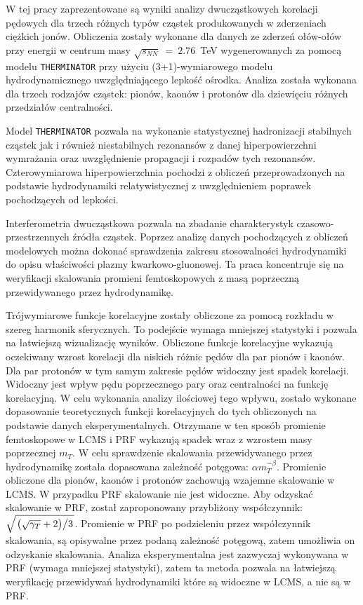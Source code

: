 W tej pracy zaprezentowane są wyniki analizy dwucząstkowych korelacji pędowych dla trzech różnych typów cząstek produkowanych w zderzeniach ciężkich jonów.
Obliczenia zostały wykonane dla danych ze zderzeń ołów-ołów przy energii w centrum masy $\sqrt{s_{NN}}~=~2.76$~TeV wygenerowanych za pomocą modelu \verb|THERMINATOR| przy użyciu (3+1)-wymiarowego modelu hydrodynamicznego uwzględniającego lepkość ośrodka.
Analiza została wykonana dla trzech rodzajów cząstek: pionów, kaonów i protonów dla dziewięciu różnych przedziałów centralności.

Model \verb|THERMINATOR| pozwala na wykonanie statystycznej hadronizacji stabilnych cząstek jak i również niestabilnych rezonansów z danej hiperpowierzchni wymrażania oraz uwzględnienie propagacji i rozpadów tych rezonansów.
Czterowymiarowa hiperpowierzchnia pochodzi z obliczeń przeprowadzonych na podstawie hydrodynamiki relatywistycznej z uwzględnieniem poprawek pochodzących od lepkości.

Interferometria dwucząstkowa pozwala na zbadanie charakterystyk czasowo-przestrzennych źródła cząstek.
Poprzez analizę danych pochodzących z obliczeń modelowych można dokonać sprawdzenia zakresu stosowalności hydrodynamiki do opisu właściwości plazmy kwarkowo-gluonowej.
Ta praca koncentruje się na weryfikacji skalowania promieni femtoskopowych z masą poprzeczną przewidywanego przez hydrodynamikę.

Trójwymiarowe funkcje korelacyjne zostały obliczone za pomocą rozkładu w szereg harmonik sferycznych.
To podejście wymaga mniejszej statystyki i pozwala na łatwiejszą wizualizację wyników.
Obliczone funkcje korelacyjne wykazują oczekiwany wzrost korelacji dla niskich różnic pędów dla par pionów i kaonów.
Dla par protonów w tym samym zakresie pędów widoczny jest spadek korelacji.
Widoczny jest wpływ pędu poprzecznego pary oraz centralności na funkcję korelacyjną.
W celu wykonania analizy ilościowej tego wpływu, zostało wykonane dopasowanie teoretycznych funkcji korelacyjnych do tych obliczonych na podstawie danych eksperymentalnych.
Otrzymane w ten sposób promienie femtoskopowe w LCMS i PRF wykazują spadek wraz z wzrostem masy poprzecznej $m_T$.
W celu sprawdzenie skalowania przewidywanego przez hydrodynamikę została dopasowana zależność potęgowa: $\alpha m_T^{-\beta}$.
Promienie obliczone dla pionów, kaonów i protonów zachowują wzajemne skalowanie w LCMS.
W przypadku PRF skalowanie nie jest widoczne.
Aby odzyskać skalowanie w PRF, został zaproponowany przybliżony współczynnik: $\sqrt{ \left. \left( \sqrt{\gamma_T} + 2 \right) \middle/ 3 \right. }$.
Promienie w PRF po podzieleniu przez współczynnik skalowania, są opisywalne przez podaną zależność potęgową, zatem umożliwia on odzyskanie skalowania.
Analiza eksperymentalna jest zazwyczaj wykonywana w PRF (wymaga mniejszej statystyki), zatem ta metoda pozwala na łatwiejszą weryfikację przewidywań hydrodynamiki które są widoczne w LCMS, a nie są w PRF.